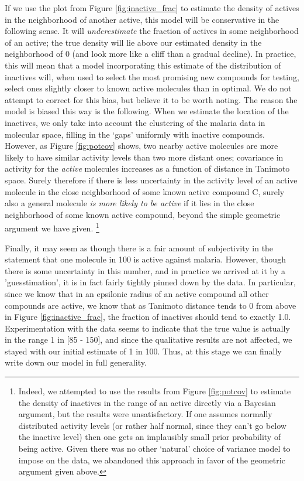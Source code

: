 \documentclass{article}
\begin{document}
If we use the plot from Figure \ref{fig:inactive_frac} to estimate the density of actives in the neighborhood of another active, this model will be conservative in the following sense.  It will \textit{underestimate} the fraction of actives in some neighborhood of an active; the true density will lie above our estimated density in the neighborhood of 0 (and look more like a cliff than a gradual decline).  In practice, this will mean that a model incorporating this estimate of the distribution of inactives will, when used to select the most promising new compounds for testing, select ones slightly closer to known active molecules than in optimal. We do not attempt to correct for this bias, but believe it to be worth noting. The reason the model is biased this way is the following. When we estimate the location of the inactives, we only take into account the clustering of the malaria data in molecular space, filling in the `gaps' uniformly with inactive compounds.  However, as Figure \ref{fig:potcov} shows, two nearby active molecules are more likely to have similar activity levels than two more distant ones; covariance in activity for the \textit{active} molecules increases as a function of distance in Tanimoto space.  Surely therefore if there is less uncertainty in the activity level of an active molecule in the close neighborhood of some known active compound C, surely also a general molecule \textit{is more likely to be active} if it lies in the close neighborhood of some known active compound, beyond the simple geometric argument we have given. \footnote{Indeed, we attempted to use the results from Figure \ref{fig:potcov} to estimate the density of inactives in the range of an active directly via a Bayesian argument, but the results were unsatisfactory.  If one assumes normally distributed activity levels (or rather half normal, since they can't go below the inactive level) then one gets an implausibly small prior probability of being active.  Given there was no other `natural' choice of variance model to impose on the data, we abandoned this approach in favor of the geometric argument given above.}
\newline
\newline

Finally, it may seem as though there is a fair amount of subjectivity in the statement that one molecule in 100 is active against malaria.  However, though there is some uncertainty in this number, and in practice we arrived at it by a 'guesstimation', it is in fact fairly tightly pinned down by the data.  In particular, since we know that in an epsilonic radius of an active compound all other compounds are active, we know that as Tanimoto distance tends to 0 from above in Figure \ref{fig:inactive_frac}, the fraction of inactives should tend to exactly 1.0.  Experimentation with the data seems to indicate that the true value is actually in the range 1 in [85 - 150], and since the qualitative results are not affected, we stayed with our initial estimate of 1 in 100.
\newline
\newline
Thus, at this stage we can finally write down our model in full generality.
\end{document}
